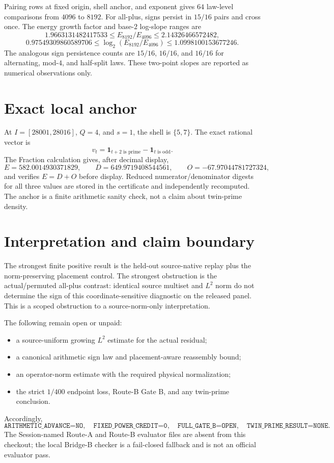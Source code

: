\documentclass[10pt]{article}
\newcommand{\1}{\mathbf 1}
\begin{document}
Pairing rows at fixed origin, shell anchor, and exponent gives $64$ law-level
comparisons from $4096$ to $8192$.  For all-plus, signs persist in $15/16$
pairs and cross once.  The energy growth factor and base-$2$ log-slope ranges
are
\[
 1.9663131482417533\leq E_{8192}/E_{4096}
 \leq2.14326466572482,
\]
\[
 0.97549309860589706\leq
 \log_2(E_{8192}/E_{4096})
 \leq1.0998100153677246.
\]
The analogous sign persistence counts are $15/16$, $16/16$, and $16/16$
for alternating, mod-$4$, and half-split laws.  These two-point slopes are
reported as numerical observations only.

\section{Exact local anchor}

At $I=[28001,28016]$, $Q=4$, and $s=1$, the shell is $\{5,7\}$.  The exact
rational vector is
\[
 v_t=\1_{t+2\text{ is prime}}-\1_{t\text{ is odd}}.
\]
The Fraction calculation gives, after decimal display,
\[
 E=582.0014930371829,\qquad
 D=649.9719408544561,\qquad
 O=-67.97044781727324,
\]
and verifies $E=D+O$ before display.  Reduced numerator/denominator digests
for all three values are stored in the certificate and independently
recomputed.  The anchor is a finite arithmetic sanity check, not a claim
about twin-prime density.

\section{Interpretation and claim boundary}

The strongest finite positive result is the held-out source-native replay plus
the norm-preserving placement control.  The strongest obstruction is the
actual/permuted all-plus contrast: identical source multiset and $L^2$ norm do
not determine the sign of this coordinate-sensitive diagnostic on the released
panel.  This is a scoped obstruction to a source-norm-only interpretation.

The following remain open or unpaid:
\begin{itemize}
  \item a source-uniform growing $L^2$ estimate for the actual residual;
  \item a canonical arithmetic sign law and placement-aware reassembly bound;
  \item an operator-norm estimate with the required physical normalization;
  \item the strict $1/400$ endpoint loss, Route-B Gate B, and any twin-prime
        conclusion.
\end{itemize}
Accordingly,
\[
 \texttt{ARITHMETIC\_ADVANCE=NO},\quad
 \texttt{FIXED\_POWER\_CREDIT=0},\quad
 \texttt{FULL\_GATE\_B=OPEN},\quad
 \texttt{TWIN\_PRIME\_RESULT=NONE}.
\]
The Session-named Route-A and Route-B evaluator files are absent from this
checkout; the local Bridge-B checker is a fail-closed fallback and is not an
official evaluator pass.
\end{document}
